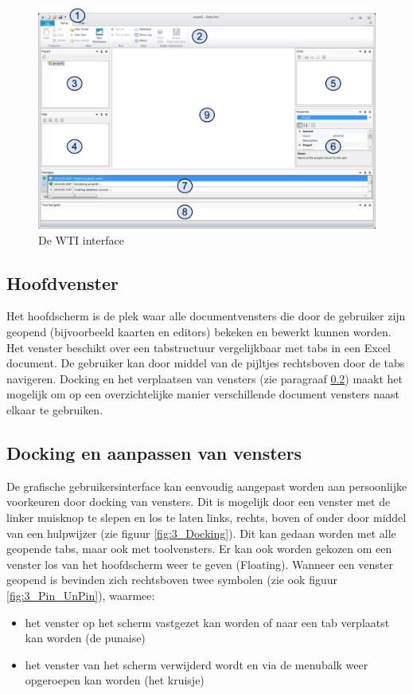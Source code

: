 \begin{figure}[H]
	\centering
		\includegraphics[width=\textwidth]{figures/chapter_general/wti_Welcome.png}
		\caption{De WTI interface}
	\label{fig:1_wti_Welcome_Page}
\end{figure}

\subsection{Hoofdvenster}
Het hoofdscherm is de plek waar alle documentvensters die door de gebruiker zijn geopend (bijvoorbeeld kaarten en editors) bekeken en bewerkt kunnen worden. Het venster beschikt over een tabstructuur vergelijkbaar met tabs in een Excel document. De gebruiker kan door middel van de pijltjes rechtsboven door de tabs navigeren. Docking en het verplaatsen van vensters (zie paragraaf \ref{sec:DS_Docking}) maakt het mogelijk om op een overzichtelijke manier verschillende document vensters naast elkaar te gebruiken.

\subsection{Docking en aanpassen van vensters}
\label{sec:DS_Docking}
De grafische gebruikersinterface kan eenvoudig aangepast worden aan persoonlijke voorkeuren door docking van vensters. Dit is mogelijk door een venster met de linker muisknop te slepen en los te laten links, rechts, boven of onder door middel van een hulpwijzer (zie figuur \ref{fig:3_Docking}). Dit kan gedaan worden met alle geopende tabs, maar ook met toolvensters. Er kan ook worden gekozen om een venster los van het hoofdscherm weer te geven (Floating). Wanneer een venster geopend is bevinden zich rechtsboven twee symbolen (zie ook figuur \ref{fig:3_Pin_UnPin}), waarmee:
\begin{itemize}
\item het venster op het scherm vastgezet kan worden of naar een tab verplaatst kan worden (de punaise)
\item het venster van het scherm verwijderd wordt en via de menubalk weer opgeroepen kan worden (het kruisje)
\end{itemize}


